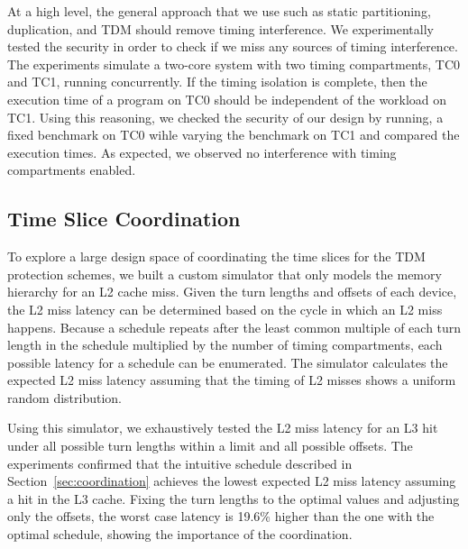 At a high level, the general approach that we use such as static partitioning,
duplication, and TDM should remove timing interference. We experimentally
tested the security in order to check if we miss any sources of timing interference.
The experiments simulate a two-core 
system with two timing compartments, TC0 and
TC1, running concurrently. 
If the timing isolation is complete, then the execution time of a program on 
TC0 should be independent of the workload on TC1.
Using this reasoning, we checked the
security of our design by running, a fixed benchmark
on TC0 wihle varying the benchmark on TC1 and compared the execution times. 
As expected, 
we observed no interference with timing compartments enabled.

\subsection{Time Slice Coordination}
\label{sec:eval_coord}

To explore a large design space of coordinating the time slices for the TDM 
protection schemes, we built a custom simulator that only models the memory
hierarchy for an L2 cache miss.
Given the turn lengths and offsets of each device, the L2 miss latency can
be determined based on the cycle in which an L2 miss happens.
Because a schedule repeats after the least common multiple of each turn length in 
the schedule multiplied by the number of timing compartments, each possible 
latency for a schedule can be enumerated. The simulator calculates
the expected L2 miss latency assuming that the timing of L2 misses shows a
uniform random distribution.

Using this simulator, we exhaustively tested the L2 miss latency for an
L3 hit under all possible turn lengths within a limit and all possible
offsets. The experiments confirmed that 
the intuitive schedule described in 
Section~\ref{sec:coordination} achieves the lowest expected L2 miss latency
assuming a hit in the L3 cache.
Fixing the turn lengths to the optimal values and adjusting only the offsets,
the worst case latency is 19.6\% higher than the one with the optimal schedule, showing
the importance of the coordination.

